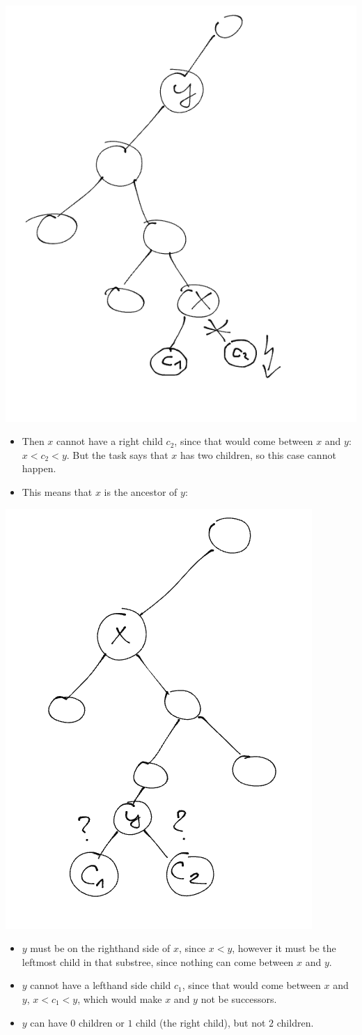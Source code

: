 \begin{center}
\includegraphics[width=0.4\linewidth]{./exams/2022_05_30/05/yancestor.png}
\end{center}

\begin{itemize}
    \item Then $x$ cannot have a right child $c_2$, since that would come between $x$ and $y$: $x<c_2<y$. But the task says that $x$ has two children, so this case cannot happen.
    \item This means that $x$ is the ancestor of $y$:
\end{itemize}

\begin{center}
\includegraphics[width=0.4\linewidth]{./exams/2022_05_30/05/xancestor.png}
\end{center}

\begin{itemize}
    \item $y$ must be on the righthand side of $x$, since $x<y$, however it must be the leftmost child in that substree, since nothing can come between $x$ and $y$.
    \item $y$ cannot have a lefthand side child $c_1$, since that would come between $x$ and $y$, $x<c_1<y$, which would make $x$ and $y$ not be successors.
    \item $y$ can have $0$ children or $1$ child (the right child), but not $2$ children.
\end{itemize}